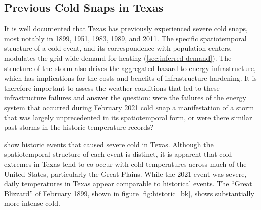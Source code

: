 \documentclass[12pt]{iopart}
\begin{document}
\subsection{Previous Cold Snaps in Texas}

It is well documented that Texas has previously experienced severe cold snaps, most notably in 1899, 1951, 1983, 1989, and 2011.
The specific spatiotemporal structure of a cold event, and its correspondence with population centers, modulates the grid-wide demand for heating (\cref{sec:inferred-demand}).
The structure of the storm also drives the aggregated hazard to energy infrastructure, which has implications for the costs and benefits of infrastructure hardening.
It is therefore important to assess the weather conditions that led to these infrastructure failures and answer the question: were the failures of the energy system that occurred during February 2021 cold snap a manifestation of a storm that was largely unprecedented in its spatiotemporal form, or were there similar past storms in the historic temperature records?

 show historic events that caused severe cold in Texas.
Although the spatiotemporal structure of each event is distinct, it is apparent that cold extremes in Texas tend to co-occur with cold temperatures across much of the United States, particularly the Great Plains.
While the 2021 event was severe, daily temperatures in Texas appear comparable to historical events.
The ``Great Blizzard'' of February 1899, shown in figure \cref{fig:historic_bk}, shows substantially more intense cold.
\end{document}
